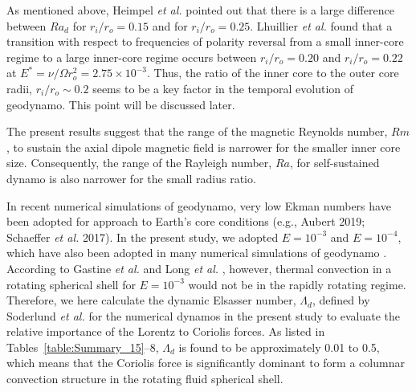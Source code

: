 As mentioned above, Heimpel {\it et al.}  pointed out that there is a large difference between $Ra_d$ for $r_i / r_o = 0.15$ and for $r_i / r_o = 0.25$.
Lhuillier {\it et al.}  found that a transition with respect to frequencies of polarity reversal from a small inner-core regime to a large inner-core regime occurs between $r_i / r_o = 0.20$ and $r_i / r_o = 0.22$ at $E^* = \nu / \Omega r_o^2 = 2.75 \times 10^{-3}$.
Thus, the ratio of the inner core to the outer core radii, $r_i / r_o \sim 0.2$ seems to be a key factor in the temporal evolution of geodynamo.
This point will be discussed later.

The present results suggest that the range of the magnetic Reynolds number, $Rm$, to sustain the axial dipole magnetic field is narrower for the smaller inner core size.
Consequently, the range of the Rayleigh number, $Ra$, for self-sustained dynamo is also narrower for the small radius ratio.



In recent numerical simulations of geodynamo, very low Ekman numbers have been adopted for approach to Earth's core conditions (e.g., Aubert 2019; Schaeffer {\it et al.} 2017).
In the present study, we adopted $E = 10^{-3}$ and $E = 10^{-4}$,
which have also been adopted in many numerical simulations of geodynamo \cite{pena:2018}.
According to Gastine {\it et al.}   and Long {\it et al.} , however, thermal convection in a rotating spherical shell for $E = 10^{-3}$ would not be in the rapidly rotating regime.
Therefore, we here calculate the dynamic Elsasser number, $\Lambda_d$, defined by Soderlund {\it et al.}  for the numerical dynamos in the present study to evaluate the relative importance of the Lorentz to Coriolis forces. 
As listed in Tables~\ref{table:Summary_15}--8, $\Lambda_d$ is found to be approximately 0.01 to 0.5, which means that the Coriolis force is significantly dominant to form a columnar convection structure in the rotating fluid spherical shell.

